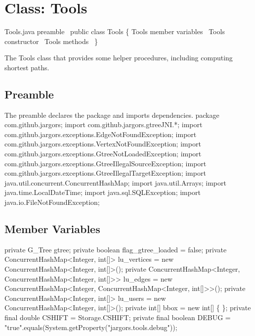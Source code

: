\nwenddocs{}\chapter{Class: Tools}
\label{tools}

\nwenddocs{}\endmoddef{}
\LA{}Tools.java preamble~{\nwtagstyle{}}\RA{}
public class Tools \{
  \LA{}\code{}Tools\edoc{} member variables~{\nwtagstyle{}}\RA{}
  \LA{}\code{}Tools\edoc{} constructor~{\nwtagstyle{}}\RA{}
  \LA{}\code{}Tools\edoc{} methods~{\nwtagstyle{}}\RA{}
\}
\nwendcode{}\nwdocspar

The Tools class that provides some helper procedures, including computing
shortest paths.

\section{Preamble}
The preamble declares the package and imports dependencies.
\nwenddocs{}\endmoddef{}
package com.github.jargors;
import com.github.jargors.gtreeJNI.*;
import com.github.jargors.exceptions.EdgeNotFoundException;
import com.github.jargors.exceptions.VertexNotFoundException;
import com.github.jargors.exceptions.GtreeNotLoadedException;
import com.github.jargors.exceptions.GtreeIllegalSourceException;
import com.github.jargors.exceptions.GtreeIllegalTargetException;
import java.util.concurrent.ConcurrentHashMap;
import java.util.Arrays;
import java.time.LocalDateTime;
import java.sql.SQLException;
import java.io.FileNotFoundException;
\nwendcode{}\nwdocspar

\section{Member Variables}
\nwenddocs{}\endmoddef{}
private G_Tree gtree;
private boolean flag_gtree_loaded = false;
private ConcurrentHashMap<Integer, int[]> lu_vertices = new ConcurrentHashMap<Integer, int[]>();
private ConcurrentHashMap<Integer,
    ConcurrentHashMap<Integer, int[]>>    lu_edges    = new ConcurrentHashMap<Integer, ConcurrentHashMap<Integer, int[]>>();
private ConcurrentHashMap<Integer, int[]> lu_users    = new ConcurrentHashMap<Integer, int[]>();
private int[] bbox = new int[] \{ \};
private final double CSHIFT = Storage.CSHIFT;
private final boolean DEBUG = "true".equals(System.getProperty("jargors.tools.debug"));
\nwendcode{}\nwdocspar

